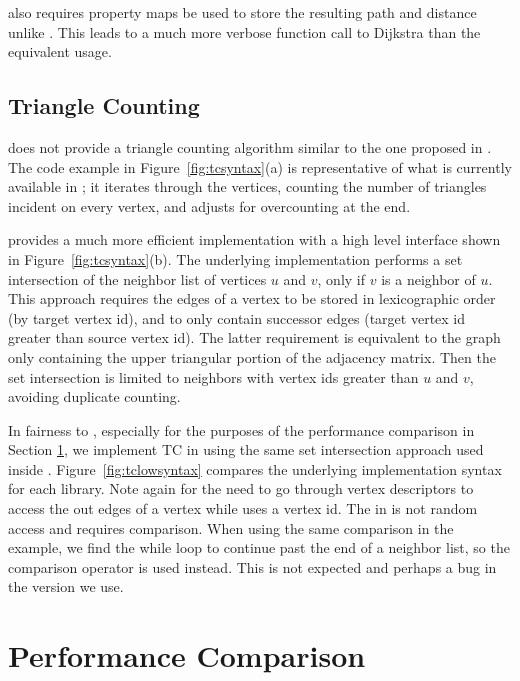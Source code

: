 \bgl also requires property maps be used to store the resulting path and distance unlike \stdgraph.
This leads to a much more verbose function call to Dijkstra than the equivalent \stdgraph
usage.

\subsection{Triangle Counting}
\bgl does not provide a triangle counting algorithm
similar to the one proposed in \stdgraph.
The code example in Figure~\ref{fig:tcsyntax}(a) is representative of what is
currently available in \bgl; it iterates through the vertices,
counting the number of triangles
incident on every vertex, and adjusts for overcounting at the end.

\stdgraph provides a much more efficient implementation with a high level
interface shown in Figure~\ref{fig:tcsyntax}(b).
The underlying \stdgraph implementation performs a set intersection
of the neighbor list of vertices $u$ and $v$, only if $v$ is a neighbor of $u$.
This approach  requires the edges of a vertex to be stored
in lexicographic order (by target vertex id), and to only contain successor
edges (target vertex id greater than source vertex id). The latter
requirement is equivalent to the graph only containing the upper triangular
portion of the adjacency matrix.
Then the set intersection is limited to neighbors with vertex ids greater
than $u$ and $v$, avoiding duplicate counting.

In fairness to \bgl, especially for the purposes of the performance comparison
in Section \ref{performance}, we implement TC in \bgl using the same set
intersection approach used inside \stdgraph.
Figure~\ref{fig:tclowsyntax} compares the underlying implementation syntax
for each library.
Note again for \bgl the need to go through vertex descriptors to access the out
edges of a vertex while \stdgraph uses a vertex id.
The  in \stdgraph is not random access and requires
\tcode{!=} comparison.
When using the same \tcode{!=} comparison in the \bgl example, we find the while loop to continue past the end of a neighbor list, so the comparison operator is used instead.
This is not expected and perhaps a bug in the \bgl version we use.

\clearpage

\section{Performance Comparison} \label{performance}

